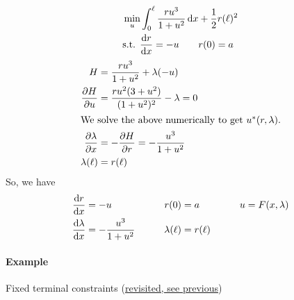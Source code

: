 \begin{align}
  & \min_u \int_0^\ell \frac{ru^3}{1+u^2}\mathop{}\!\mathrm{d} x + \frac12 r(\ell)^2 \\
  & \text{s.t. } \frac{\mathop{}\!\mathrm{d} r}{\mathop{}\!\mathrm{d} x} = -u \qquad r(0) = a
\end{align}
\begin{align}
  H &= \frac{ru^3}{1+u^2} + \lambda(-u) \\
  \frac{\partial H}{\partial u} &= \frac{ru^2(3+u^2)}{(1+u^2)^2} - \lambda = 0 \\
  \shortintertext{We solve the above numerically to get $u^*(r,\lambda)$.}
  \frac{\partial \lambda}{\partial x} &= -\frac{\partial H}{\partial r} = -\frac{u^3}{1+u^2} \\
  \lambda(\ell) &= r(\ell)
\end{align}
So, we have
\begin{alignat}{3}
  \frac{\mathop{}\!\mathrm{d} r}{\mathop{}\!\mathrm{d} x} &= -u & r(0) &= a & u &= F(x,\lambda) \\
  \frac{\mathop{}\!\mathrm{d}\lambda}{\mathop{}\!\mathrm{d} x} &= -\frac{u^3}{1+u^2} \qquad & \lambda(\ell) &= r(\ell) \qquad
\end{alignat}

\paragraph{Example} Fixed terminal constraints (\hyperlink{fixed_term_cons}{revisited, see previous})

